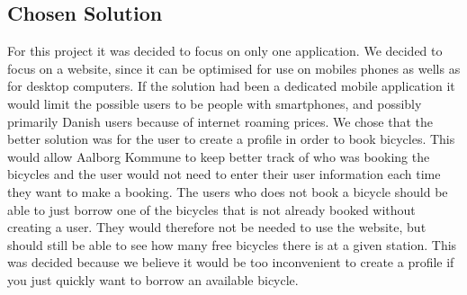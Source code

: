 \subsection{Chosen Solution}
For this project it was decided to focus on only one application.
We decided to focus on a website, since it can be optimised for use on mobiles phones as wells as for desktop computers. 
If the solution had been a dedicated mobile application it would limit the possible users to be people with smartphones, and possibly primarily Danish users because of internet roaming prices.
We chose that the better solution was for the user to create a profile in order to book bicycles. 
This would allow Aalborg Kommune to keep better track of who was booking the bicycles and the user would not need to enter their user information each time they want to make a booking.
The users who does not book a bicycle should be able to just borrow one of the bicycles that is not already booked without creating a user.
They would therefore not be needed to use the website, but should still be able to see how many free bicycles there is at a given station.
This was decided because we believe it would be too inconvenient to create a profile if you just quickly want to borrow an available bicycle.